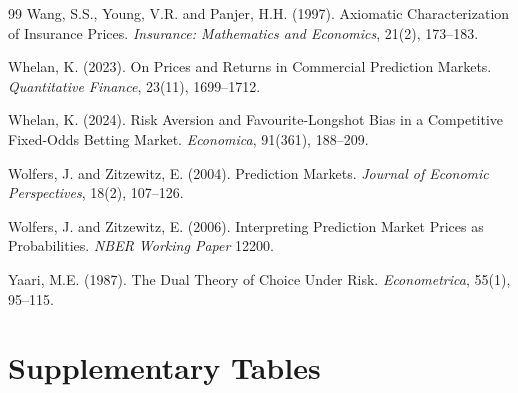 \documentclass[12pt,a4paper]{article}
\begin{document}
\begin{thebibliography}{99}
 Wang, S.S., Young, V.R. and Panjer, H.H. (1997). Axiomatic
  Characterization of Insurance Prices. \emph{Insurance: Mathematics and
  Economics}, 21(2), 173--183.

 Whelan, K. (2023). On Prices and Returns in Commercial Prediction
  Markets. \emph{Quantitative Finance}, 23(11), 1699--1712.

 Whelan, K. (2024). Risk Aversion and Favourite-Longshot Bias in a
  Competitive Fixed-Odds Betting Market. \emph{Economica}, 91(361),
  188--209.

 Wolfers, J. and Zitzewitz, E. (2004). Prediction Markets.
  \emph{Journal of Economic Perspectives}, 18(2), 107--126.

 Wolfers, J. and Zitzewitz, E. (2006). Interpreting Prediction Market
  Prices as Probabilities. \emph{NBER Working Paper} 12200.

 Yaari, M.E. (1987). The Dual Theory of Choice Under Risk.
  \emph{Econometrica}, 55(1), 95--115.

\end{thebibliography}

\newpage

\appendix\section{Supplementary Tables}\label{appendix}
\end{document}
